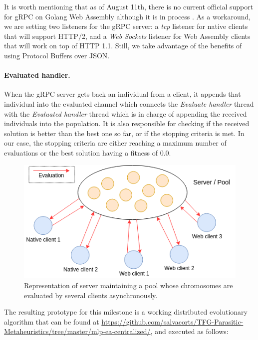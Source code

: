 It is worth mentioning that as of August 11th, there is no current official support for gRPC on Golang Web Assembly although it is in process \cite{grpc-wasm-issue}. As a workaround, we are setting two listeners for the gRPC server: a \textit{tcp} listener for native clients that will support HTTP/2, and a \textit{Web Sockets} listener for Web Assembly clients that will work on top of HTTP 1.1. Still, we take advantage of the benefits of using Protocol Buffers over JSON.

\paragraph*{Evaluated handler.} When the gRPC server gets back an individual from a client, it appends that individual into the evaluated channel which connects the \textit{Evaluate handler} thread with the \textit{Evaluated handler} thread which is in charge of appending the received individuals into the population. It is also responsible for checking if the received solution is better than the best one so far, or if the stopping criteria is met. In our case, the stopping criteria are either reaching a maximum number of evaluations or the best solution having a fitness of 0.0.

\begin{figure}[h!]
		\centering
    	\includegraphics[scale=0.5]{assets/images/tfg-net-milestone2.png}
    	\caption{Representation of server maintaining a pool whose chromosomes are evaluated by several clients asynchronously.}
    	\label{fig:tfg-net-milestone2}
\end{figure}

The resulting prototype for this milestone is a working distributed evolutionary algorithm that can be found at \href{github.com/salvacorts/TFG-Parasitic-Metaheuristics/tree/master/mlp-ea-centralized/common}{https://github.com/salvacorts/TFG-Parasitic-Metaheuristics/tree/master/mlp-ea-centralized/}, and executed as follows:

